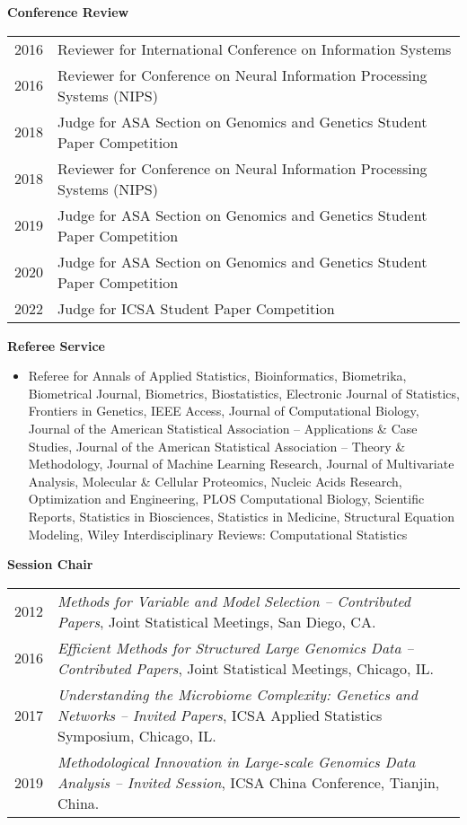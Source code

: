 \documentclass[10pt]{article}
\begin{document}
\textbf{Conference Review}
\begin{table}[H]
\hskip0.9cm\begin{tabular}{p{1.6cm}p{12cm}}
2016 & Reviewer for  International Conference on Information Systems \\
2016 & Reviewer for  Conference on Neural Information Processing Systems (NIPS)\\
2018 & Judge for  ASA Section on Genomics and Genetics Student Paper Competition\\ 
2018 & Reviewer for  Conference on Neural Information Processing Systems (NIPS) \\
2019 & Judge for  ASA Section on Genomics and Genetics Student Paper Competition \\
2020 & Judge for  ASA Section on Genomics and Genetics Student Paper Competition \\
2022 & Judge for ICSA Student Paper Competition 
\end{tabular}
\end{table}

\textbf{Referee Service} 
\begin{itemize}
\item[] Referee for 
Annals of Applied Statistics,
Bioinformatics, 
Biometrika, 
Biometrical Journal, 
Biometrics, 
Biostatistics, 
Electronic Journal of Statistics, 
Frontiers in Genetics, 
IEEE Access, 
Journal of Computational Biology, 
Journal of the American Statistical Association -- Applications \& Case Studies, 
Journal of the American Statistical Association -- Theory \& Methodology, 
Journal of Machine Learning Research, 
Journal of Multivariate Analysis, 
Molecular \& Cellular Proteomics, 
Nucleic Acids Research, 
Optimization and Engineering, 
PLOS Computational Biology, 
Scientific Reports, 
Statistics in Biosciences, 
Statistics in Medicine,
Structural Equation Modeling, 
Wiley Interdisciplinary Reviews: Computational Statistics 
\end{itemize}

\textbf{Session Chair}
\begin{table}[H]
\hskip0.9cm\begin{tabular}{p{1.6cm}p{12cm}}
2012 & {\em Methods for Variable and Model Selection -- Contributed Papers}, Joint Statistical Meetings, San Diego, CA. \\
2016 & {\em Efficient Methods for Structured Large Genomics Data -- Contributed Papers}, Joint Statistical Meetings, Chicago, IL. \\
2017 & {\em  Understanding the Microbiome Complexity: Genetics and Networks -- Invited Papers}, ICSA Applied Statistics Symposium, Chicago, IL. \\
2019 & {\em Methodological Innovation in Large-scale Genomics Data Analysis -- Invited Session}, ICSA China Conference, Tianjin, China. 
\end{tabular}
\end{table}
\end{document}
